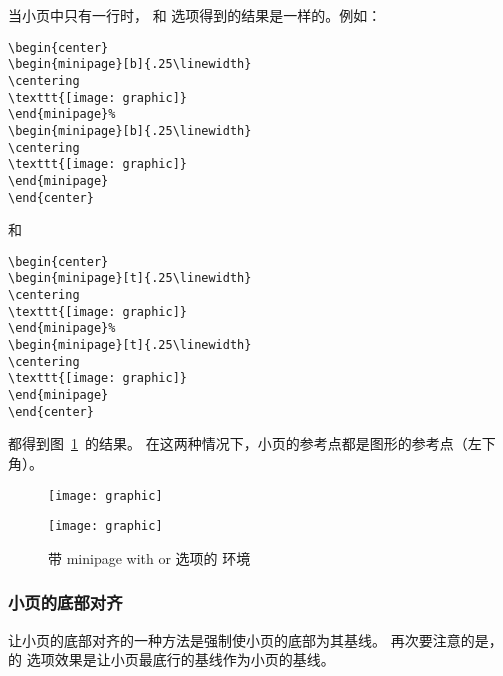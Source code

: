 当小页中只有一行时， \opt{[b]} 和 \opt{[t]} 选项得到的结果是一样的。例如：
\begin{lstlisting}
\begin{center}
\begin{minipage}[b]{.25\linewidth}
\centering
\texttt{[image: graphic]}
\end{minipage}%
\begin{minipage}[b]{.25\linewidth}
\centering
\texttt{[image: graphic]}
\end{minipage}
\end{center}
\end{lstlisting}
和
\begin{lstlisting}
\begin{center}
\begin{minipage}[t]{.25\linewidth}
\centering
\texttt{[image: graphic]}
\end{minipage}%
\begin{minipage}[t]{.25\linewidth}
\centering
\texttt{[image: graphic]}
\end{minipage}
\end{center}
\end{lstlisting}
都得到图~\ref{fig:minipagesamp-1}~的结果。
在这两种情况下，小页的参考点都是图形的参考点（左下角）。
\begin{figure}
\begin{center}
	\begin{minipage}[t]{.25\linewidth}
		\centering
		\texttt{[image: graphic]}
	\end{minipage}%
	\begin{minipage}[t]{.25\linewidth}
		\centering
		\texttt{[image: graphic]}
	\end{minipage}
\end{center}
\caption{带 minipage with \opt{[b]} or \opt{[t]} 选项的  环境}
\label{fig:minipagesamp-1}
\end{figure}

\subsubsection{小页的底部对齐}
让小页的底部对齐的一种方法是强制使小页的底部为其基线。
再次要注意的是， 的 \opt{[b]} 选项效果是让小页最底行的基线作为小页的基线。

